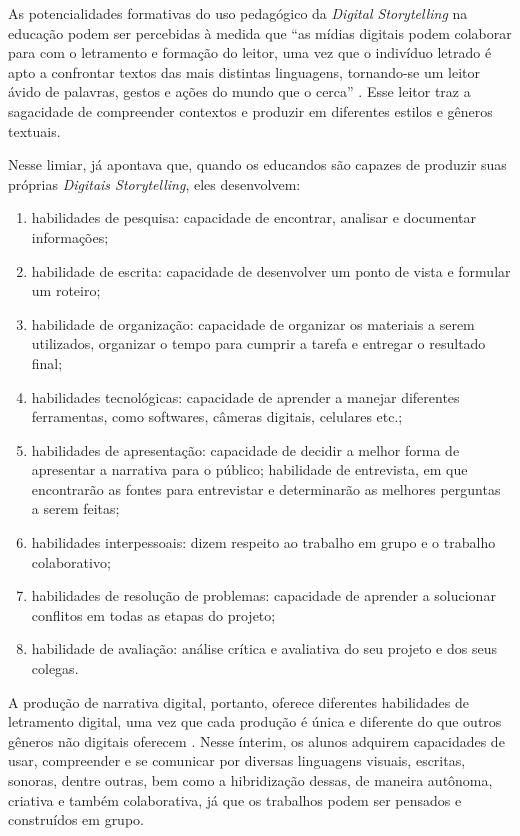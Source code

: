 \documentclass[portuguese]{textolivre}
\begin{document}
As potencialidades formativas do uso pedagógico da \textit{Digital Storytelling} na educação podem ser percebidas à medida que “as mídias digitais podem colaborar para com o letramento e formação do leitor, uma vez que o indivíduo letrado é apto a confrontar textos das mais distintas linguagens, tornando-se um leitor ávido de palavras, gestos e ações do mundo que o cerca” \cite[p. 1160]{prado2017narrativas}. Esse leitor traz a sagacidade de compreender contextos e produzir em diferentes estilos e gêneros textuais.

Nesse limiar, \textcite{robin2006usos} já apontava que, quando os educandos são capazes de produzir suas próprias \textit{Digitais Storytelling}, eles desenvolvem:
\begin{enumerate}
    \item habilidades de pesquisa: capacidade de encontrar, analisar e documentar informações;
    \item habilidade de escrita: capacidade de desenvolver um ponto de vista e formular um roteiro;
    \item habilidade de organização: capacidade de organizar os materiais a serem utilizados, organizar o tempo para cumprir a tarefa e entregar o resultado final;
    \item habilidades tecnológicas: capacidade de aprender a manejar diferentes ferramentas, como softwares, câmeras digitais, celulares etc.;
    \item habilidades de apresentação: capacidade de decidir a melhor forma de apresentar a narrativa para o público; habilidade de entrevista, em que encontrarão as fontes para entrevistar e determinarão as melhores perguntas a serem feitas;
    \item habilidades interpessoais: dizem respeito ao trabalho em grupo e o trabalho colaborativo;
    \item habilidades de resolução de problemas: capacidade de aprender a solucionar conflitos em todas as etapas do projeto;
    \item habilidade de avaliação: análise crítica e avaliativa do seu projeto e dos seus colegas.
\end{enumerate}

A produção de narrativa digital, portanto, oferece diferentes habilidades de letramento digital, uma vez que cada produção é única e diferente do que outros gêneros não digitais oferecem \cite{signes2010practical}. Nesse ínterim, os alunos adquirem capacidades de usar, compreender e se comunicar por diversas linguagens visuais, escritas, sonoras, dentre outras, bem como a hibridização dessas, de maneira autônoma, criativa e também colaborativa, já que os trabalhos podem ser pensados e construídos em grupo.
\end{document}
